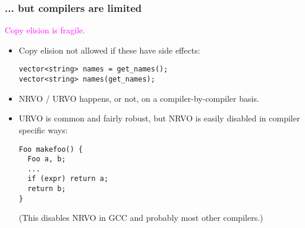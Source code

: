 \begin{frame}[fragile,t]
\frametitle{... but compilers are limited}

\textcolor{magenta}{Copy elision is fragile. %
}


\begin{itemize}
\item<1-> Copy elision not allowed if these have side effects:
{\scriptsize
\begin{verbatim}
vector<string> names = get_names();
vector<string> names(get_names);
\end{verbatim}
}

\item<2-> NRVO / URVO happens, or not, on a compiler-by-compiler
basis.
\item<3-> URVO is common and fairly robust, but NRVO is easily disabled in compiler specific ways:
{\scriptsize
\begin{verbatim}
Foo makefoo() {
  Foo a, b;
  ...
  if (expr) return a;
  return b;
}
\end{verbatim}
}
(This disables NRVO in GCC and probably most other compilers.)
\end{itemize}

\end{frame}

